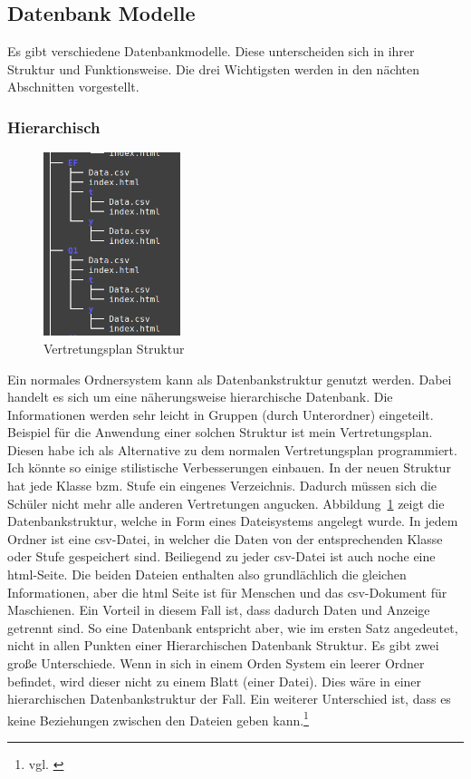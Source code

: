 \documentclass[a4paper, 12pt]{article}
\theoremstyle{plain}
\theoremstyle{definition}
\begin{document}
	\subsection{Datenbank Modelle}
	\label{sec:dbMod}
	Es gibt verschiedene Datenbankmodelle. Diese unterscheiden sich in ihrer Struktur und Funktionsweise. Die drei Wichtigsten werden in den nächten Abschnitten vorgestellt.
	
	\subsubsection{Hierarchisch}
	\label{sec:hierdb}
	
	\begin{figure}
	\vspace{-13pt}
	\includegraphics[width=4cm]{vertretungTree.png}
	\vspace{-30pt}
	\caption{Vertre\-tungsplan Struktur}\label{fig:verTree}
	\end{figure}
	Ein normales Ordnersystem kann als Datenbankstruktur genutzt werden. Dabei handelt es sich um eine näherungsweise hierarchische Datenbank. Die Informationen werden sehr leicht in Gruppen (durch Unterordner) eingeteilt. Beispiel für die Anwendung einer solchen Struktur ist mein Vertretungsplan. Diesen habe ich als Alternative zu dem normalen Vertretungsplan programmiert. Ich könnte so einige stilistische Verbesserungen einbauen. In der neuen Struktur hat jede Klasse bzm. Stufe ein eingenes Verzeichnis. Dadurch müssen sich die Schüler nicht mehr alle anderen Vertretungen angucken.  Abbildung~\ref{fig:verTree} zeigt die Datenbankstruktur, welche in Form eines Dateisystems angelegt wurde. In jedem Ordner ist eine csv-Datei, in welcher die Daten von der entsprechenden Klasse oder Stufe gespeichert sind. Beiliegend zu jeder csv-Datei ist auch noche eine html-Seite. Die beiden Dateien enthalten also grundlächlich die gleichen Informationen, aber die html Seite ist für Menschen und das csv-Dokument für Maschienen. Ein Vorteil in diesem Fall ist, dass dadurch Daten und Anzeige getrennt sind. So eine Datenbank entspricht aber, wie im ersten Satz angedeutet, nicht in allen Punkten einer Hierarchischen Datenbank Struktur. Es gibt zwei große Unterschiede. Wenn in sich in einem Orden System ein leerer Ordner befindet, wird dieser nicht zu einem Blatt (einer Datei). Dies wäre in einer hierarchischen Datenbankstruktur der Fall. Ein weiterer Unterschied ist, dass es keine Beziehungen zwischen den Dateien geben kann.\footnote{vgl. \cite{hierDbWiki}}\\
\end{document}
